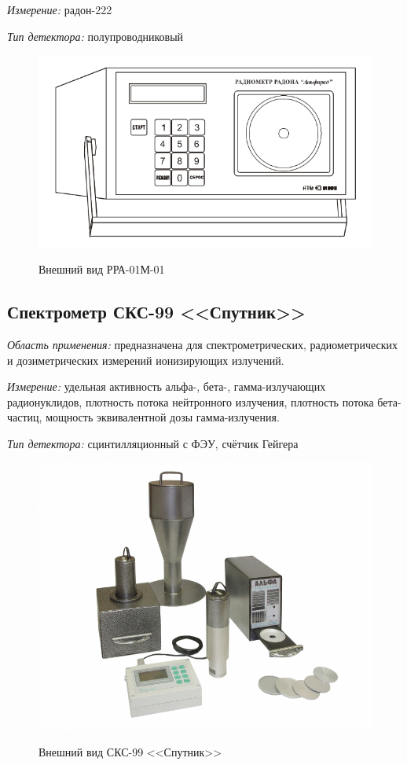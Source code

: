 \documentclass[14pt,pscyr,titlepage]{hedreport}
\begin{document}
		\emph{Измерение:} радон-222

		\emph{Тип детектора:} полупроводниковый

		\begin{figure}[h!]
			\center
			\includegraphics[width=.8\textwidth]{RRA-01M-01} \\
			\caption{Внешний вид РРА-01М-01}
		\end{figure}

	\pagebreak

	\subsection{Спектрометр СКС-99 <<Спутник>>}
		\emph{Область применения:} предназначена для спектрометрических, 
			радиометрических и дозиметрических измерений ионизирующих 
			излучений.

		\emph{Измерение:} удельная активность альфа-, бета-, гамма-излучающих 
			радионуклидов,  плотность потока нейтронного излучения, плотность 
			потока бета-частиц, мощность эквивалентной дозы гамма-излучения.

		\emph{Тип детектора:} сцинтилляционный с ФЭУ, счётчик Гейгера

		\begin{figure}[h!]
			\center
			\includegraphics[width=.8\textwidth]{CKC-99} \\
			\caption{Внешний вид СКС-99 <<Спутник>>}
		\end{figure}
\end{document}
